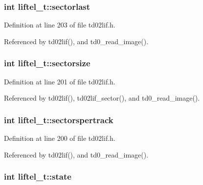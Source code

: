 \subsubsection[{\texorpdfstring{sectorlast}{sectorlast}}]{\setlength{\rightskip}{0pt plus 5cm}int liftel\+\_\+t\+::sectorlast}\hypertarget{structliftel__t_aae9fb3e37531df4dfdf0b2906ec95026}{}\label{structliftel__t_aae9fb3e37531df4dfdf0b2906ec95026}


Definition at line 203 of file td02lif.\+h.



Referenced by td02lif(), and td0\+\_\+read\+\_\+image().

\subsubsection[{\texorpdfstring{sectorsize}{sectorsize}}]{\setlength{\rightskip}{0pt plus 5cm}int liftel\+\_\+t\+::sectorsize}\hypertarget{structliftel__t_aaf7b830b7b2791c56c83082bb9dba7d9}{}\label{structliftel__t_aaf7b830b7b2791c56c83082bb9dba7d9}


Definition at line 201 of file td02lif.\+h.



Referenced by td02lif(), td02lif\+\_\+sector(), and td0\+\_\+read\+\_\+image().

\subsubsection[{\texorpdfstring{sectorspertrack}{sectorspertrack}}]{\setlength{\rightskip}{0pt plus 5cm}int liftel\+\_\+t\+::sectorspertrack}\hypertarget{structliftel__t_a69b69f0cd2e8f0017178bafd5a7a7585}{}\label{structliftel__t_a69b69f0cd2e8f0017178bafd5a7a7585}


Definition at line 200 of file td02lif.\+h.



Referenced by td02lif(), and td0\+\_\+read\+\_\+image().

\subsubsection[{\texorpdfstring{state}{state}}]{\setlength{\rightskip}{0pt plus 5cm}int liftel\+\_\+t\+::state}\hypertarget{structliftel__t_a579b9a2411fc6cf4bcdd4cac15d48e49}{}\label{structliftel__t_a579b9a2411fc6cf4bcdd4cac15d48e49}


